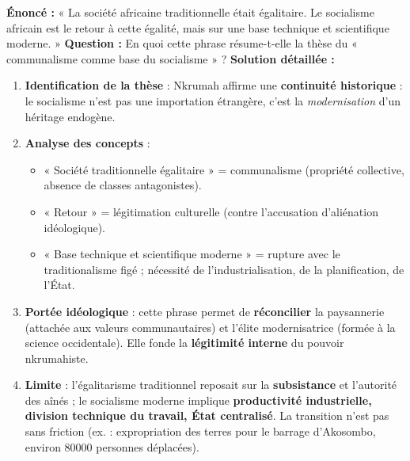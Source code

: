 \documentclass[11pt]{article}
\begin{document}
\begin{exoresolu}
\textbf{Énoncé :} « La société africaine traditionnelle était égalitaire. Le socialisme africain est le retour à cette égalité, mais sur une base technique et scientifique moderne. »
\textbf{Question :} En quoi cette phrase résume-t-elle la thèse du « communalisme comme base du socialisme » ?
\tcblower
\textbf{Solution détaillée :}
\begin{enumerate}
    \item \textbf{Identification de la thèse} : Nkrumah affirme une \textbf{continuité historique} : le socialisme n'est pas une importation étrangère, c'est la \emph{modernisation} d'un héritage endogène.
    \item \textbf{Analyse des concepts} :
        \begin{itemize}
            \item « Société traditionnelle égalitaire » = communalisme (propriété collective, absence de classes antagonistes).
            \item « Retour » = légitimation culturelle (contre l'accusation d'aliénation idéologique).
            \item « Base technique et scientifique moderne » = rupture avec le traditionalisme figé ; nécessité de l'industrialisation, de la planification, de l'État.
        \end{itemize}
    \item \textbf{Portée idéologique} : cette phrase permet de \textbf{réconcilier} la paysannerie (attachée aux valeurs communautaires) et l'élite modernisatrice (formée à la science occidentale). Elle fonde la \textbf{légitimité interne} du pouvoir nkrumahiste.
    \item \textbf{Limite} : l'égalitarisme traditionnel reposait sur la \textbf{subsistance} et l'autorité des aînés ; le socialisme moderne implique \textbf{productivité industrielle, division technique du travail, État centralisé}. La transition n'est pas sans friction (ex. : expropriation des terres pour le barrage d'Akosombo, environ \num{80000} personnes déplacées).
\end{enumerate}
\end{exoresolu}
\end{document}
